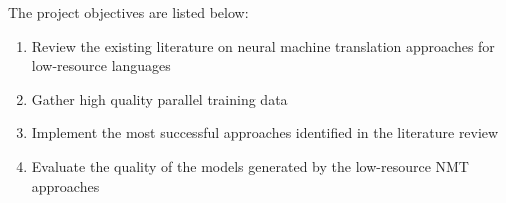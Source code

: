 The project objectives are listed below:

\begin{enumerate}
  \item Review the existing literature on neural machine translation approaches for low-resource languages
  \item Gather high quality parallel training data
  \item Implement the most successful approaches identified in the literature review
  \item Evaluate the quality of the models generated by the low-resource \acrshort{NMT} approaches
\end{enumerate}
